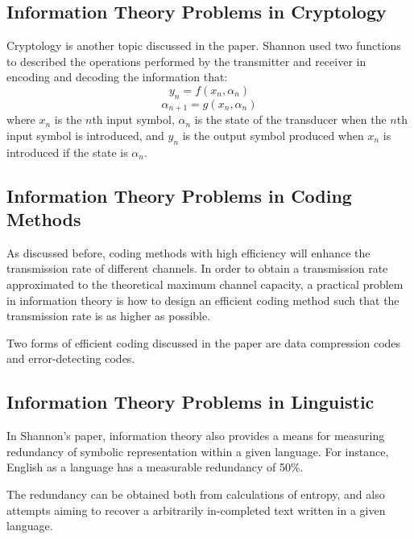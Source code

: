 \documentclass[12pt]{article}
\begin{document}
		\subsection{Information Theory Problems in Cryptology}
		Cryptology is another topic discussed in the paper. Shannon used two functions to described the operations performed by the transmitter and receiver in encoding and decoding the information that: $$y_n = f(x_n, \alpha_n)$$ $$\alpha_{n+1} = g(x_n, \alpha_n)$$ where $x_n$ is the $n$th input symbol, $\alpha_n$ is the state of the transducer when the $n$th input symbol is introduced, and $y_n$ is the output symbol produced when $x_n$ is introduced if the state is $\alpha_n$. \par 
		
		\subsection{Information Theory Problems in Coding Methods}
		As discussed before, coding methods with high efficiency will enhance the transmission rate of different channels. In order to obtain a transmission rate approximated to the theoretical maximum channel capacity, a practical problem in information theory is  how to design an efficient coding method such that the transmission rate is as higher as possible. \par 
		Two forms of efficient coding discussed in the paper are data compression codes and error-detecting codes.\par 
		
		\subsection{Information Theory Problems in Linguistic}
		In Shannon's paper, information theory also provides a means for measuring redundancy of symbolic representation within a given language. For instance, English as a language has a measurable redundancy of 50\%. \par
		The redundancy can be obtained both from calculations of entropy, and also attempts aiming to recover a arbitrarily in-completed text written in a given language. \par  
		
\end{document}
